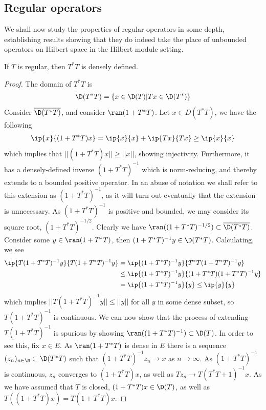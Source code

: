 \subsection{Regular operators}
We shall now study the properties of regular operators in some depth, establishing results showing that they do indeed take the place of unbounded operators on Hilbert space in the Hilbert \Cstar module setting. 
\begin{lemma}\label{lance91}
	If $T$ is regular, then $T^*T$ is densely defined.
\end{lemma}
\begin{proof}
	The domain of $T^*T$ is 
	\begin{align*}
		\D(T^*T)=\{x\in \D(T)| Tx\in \D(T^*)\}
	\end{align*}
Consider $\overline{\D(T^*T)}$, and consider $\ran(1+T^*T)$. Let $x\in D(T^*T)$, we have the following 
\begin{align*}
	\ip{x}{(1+T^*T)x}=\ip{x}{x}+\ip{Tx}{Tx} \geq \ip{x}{x}
\end{align*}
which implies that $||(1+T^*T)x||\geq ||x||$, showing injectivity. Furthermore, it has a densely-defined inverse $(1+T^*T)^{-1}$ which is norm-reducing, and thereby extends to a bounded positive operator. In an abuse of notation we shall refer to this extension as $(1+T^*T)^{-1}$, as it will turn out eventually that the extension is unnecessary. 
 As $(1+T^*T)^{-1}$ is positive and bounded, we may consider its square root, $(1+T^*T)^{-1/2}$. Clearly we have $\ran((1+T^*T)^{-1/2}) \subset \overline{\D(T^*T)}$. Consider some $y\in \ran(1+T^*T)$, then $(1+T^*T)^{-1}y\in \D(T^*T)$. Calculating, we see
\begin{align*}
	\ip{T(1+T^*T)^{-1}y}{T(1+T^*T)^{-1}y}&=\ip{(1+T^*T)^{-1}y}{T^*T(1+T^*T)^{-1}y} \\
	&\leq \ip{(1+T^*T)^{-1}y}{(1+T^*T)(1+T^*T)^{-1}y}\\
	&=\ip{(1+T^*T)^{-1}y}{y}\leq \ip{y}{y}
\end{align*} 
which implies $||T(1+T^*T)^{-1}y||\leq ||y||$ for all $y$ in some dense subset, so $T(1+T^*T)^{-1}$ is continuous. We can now show that the process of extending $T(1+T^*T)^{-1}$ is spurious by showing $\ran((1+T^*T)^{-1})\subset \D(T)$. In order to see this, fix $x\in E$. As $\ran(1+T^*T)$ is dense in $E$ there is a sequence $(z_n)_{n\in \N} \subset \D(T^*T)$ such that $(1+T^*T)^{-1}z_n\to x$ as $n\to \infty$. As $(1+T^*T)^{-1}$ is continuous, $z_n$ converges to $(1+T^*T)x$, as well as $Tz_n\to T(T^*T+1)^{-1}x$. As we have assumed that $T$ is closed, $(1+T^*T)x\in \D(T)$, as well as $T((1+T^*T)x)=T(1+T^*T)x$. 

\end{proof}
